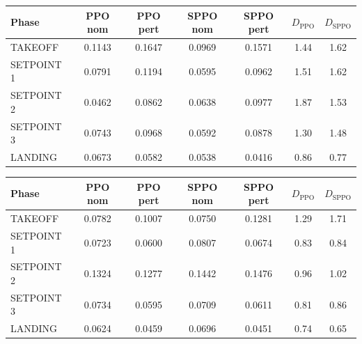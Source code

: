 
\begin{tabular}{lcccccc}
\toprule
Phase & PPO nom & PPO pert & SPPO nom & SPPO pert & $D_{\mathrm{PPO}}$ & $D_{\mathrm{SPPO}}$ \\
\midrule
TAKEOFF & 0.1143 & 0.1647 & 0.0969 & 0.1571 & 1.44 & 1.62 \\
SETPOINT 1 & 0.0791 & 0.1194 & 0.0595 & 0.0962 & 1.51 & 1.62 \\
SETPOINT 2 & 0.0462 & 0.0862 & 0.0638 & 0.0977 & 1.87 & 1.53 \\
SETPOINT 3 & 0.0743 & 0.0968 & 0.0592 & 0.0878 & 1.30 & 1.48 \\
LANDING & 0.0673 & 0.0582 & 0.0538 & 0.0416 & 0.86 & 0.77 \\
\bottomrule
\end{tabular}

\begin{tabular}{lcccccc}
\toprule
Phase & PPO nom & PPO pert & SPPO nom & SPPO pert & $D_{\mathrm{PPO}}$ & $D_{\mathrm{SPPO}}$ \\
\midrule
TAKEOFF & 0.0782 & 0.1007 & 0.0750 & 0.1281 & 1.29 & 1.71 \\
SETPOINT 1 & 0.0723 & 0.0600 & 0.0807 & 0.0674 & 0.83 & 0.84 \\
SETPOINT 2 & 0.1324 & 0.1277 & 0.1442 & 0.1476 & 0.96 & 1.02 \\
SETPOINT 3 & 0.0734 & 0.0595 & 0.0709 & 0.0611 & 0.81 & 0.86 \\
LANDING & 0.0624 & 0.0459 & 0.0696 & 0.0451 & 0.74 & 0.65 \\
\bottomrule
\end{tabular}
